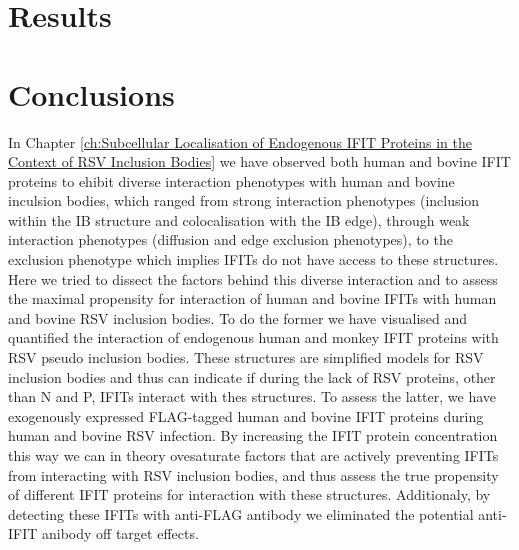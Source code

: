 \section{Results} \label{sec:Results-Chapter4}



\section{Conclusions} \label{sec:Conclusions-Chapter4}
In Chapter \ref{ch:Subcellular Localisation of Endogenous IFIT Proteins in the Context of RSV Inclusion Bodies} we have observed both human and bovine IFIT proteins to ehibit diverse interaction phenotypes with human and bovine inculsion bodies, which ranged from strong interaction phenotypes (inclusion within the IB structure and colocalisation with the IB edge), through weak interaction phenotypes (diffusion and edge exclusion phenotypes), to the exclusion phenotype which implies IFITs do not have access to these structures. Here we tried to dissect the factors behind this diverse interaction and to assess the maximal propensity for interaction of human and bovine IFITs with human and bovine RSV inclusion bodies. To do the former we have visualised and quantified the interaction of endogenous human and monkey IFIT proteins with RSV pseudo inclusion bodies. These structures are simplified models for RSV inclusion bodies and thus can indicate if during the lack of RSV proteins, other than N and P, IFITs interact with thes structures. To assess the latter, we have exogenously expressed FLAG-tagged human and bovine IFIT proteins during human and bovine RSV infection. By increasing the IFIT protein concentration this way we can in theory ovesaturate factors that are actively preventing IFITs from interacting with RSV inclusion bodies, and thus assess the true propensity of different IFIT proteins for interaction with these structures. Additionaly, by detecting these IFITs with anti-FLAG antibody we eliminated the potential anti-IFIT anibody off target effects.

